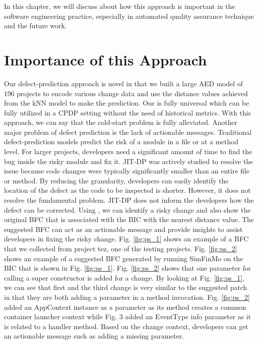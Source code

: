 In this chapter, we will discuss about how this approach is important in the software engineering practice, especially in automated quality assurance technique and the future work.

\section{Importance of this Approach}
Our defect-prediction approach is novel in that we built a large AED model of 196 projects to encode various change data and use the distance values achieved from the kNN model to make the prediction.
Our {\simfinmo} is fully universal which can be fully utilized in a CPDP setting without the need of historical metrics.
With this approach, we can say that the cold-start problem is fully alleviated.
Another major problem of defect prediction is the lack of actionable messages.
Traditional defect-prediction models predict the risk of a module in a file or at a method level.
For larger projects, developers need a significant amount of time to find the bug inside the risky module and fix it.
JIT-DP was actively studied to resolve the issue because code changes were typically significantly smaller than an entire file or method.
By reducing the granularity, developers can easily identify the location of the defect as the code to be inspected is shorter.
However, it does not resolve the fundamental problem.
JIT-DP does not inform the developers how the defect can be corrected.
Using {\simfinmo}, we can identify a risky change and also show the original BFC that is associated with the BIC with the nearest distance value.
The suggested BFC can act as an actionable message and provide insights to assist developers in fixing the risky change.
Fig. \ref{fig:ps_1} shows an example of a BFC that we collected from project tez, one of the testing projects.
Fig. \ref{fig:ps_2} shows an example of a suggested BFC generated by running SimFinMo on the BIC that is shown in Fig. \ref{fig:ps_1}.
Fig. \ref{fig:ps_2} shows that one parameter for calling a super constructor is added for a change.
By looking at Fig. \ref{fig:ps_1}, we can see that first and the third change is very similar to the suggested patch in that they are both adding a parameter in a method invocation.
Fig. \ref{fig:ps_2} added an AppContext instance as a parameter as its method creates a common container launcher context while Fig. 3 added an EventType info parameter as it is related to a handler method.
Based on the change context, developers can get an actionable message such as adding a missing parameter.
